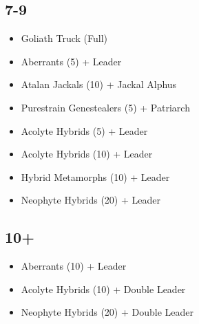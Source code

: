 \documentclass{HordeModeTarot}
\begin{document}
\begin{multicols}{2}
\subsection*{7-9}

\begin{itemize}[leftmargin=*]
\item[] Goliath Truck (Full)
\item[] Aberrants (5) + Leader
\item[] Atalan Jackals (10) + Jackal Alphus
\item[] Purestrain Genestealers (5) +  Patriarch
\item[] Acolyte Hybrids (5) + Leader
\item[] Acolyte Hybrids (10) + Leader
\item[] Hybrid Metamorphs (10) + Leader
\item[] Neophyte Hybrids (20) + Leader
\end{itemize}

\subsection*{10+}

\begin{itemize}[leftmargin=*]
\item[] Aberrants (10) + Leader
\item[] Acolyte Hybrids (10) + Double Leader
\item[] Neophyte Hybrids (20) + Double Leader
\end{itemize}


\end{multicols}
\end{document}
